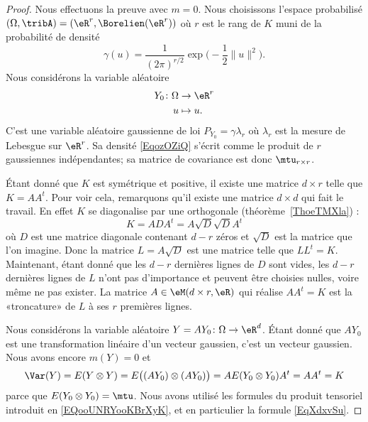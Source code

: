 \begin{proof}
	Nous effectuons la preuve avec \( m=0\). Nous choisissons l'espace probabilisé \( (\Omega,\tribA)=(\eR^r,\Borelien(\eR^r))\) où \( r\) est le rang de \( K\) muni de la probabilité de densité
	\begin{equation}    \label{EqozOZiQ}
		\gamma(u)=\frac{1}{ (2\pi)^{r/2} }\exp\big( -\frac{ 1 }{2}\| u \|^2 \big).
	\end{equation}
	Nous considérons la variable aléatoire
	\begin{equation}
		\begin{aligned}
			Y_0\colon \Omega & \to \eR^r  \\
			u                & \mapsto u.
		\end{aligned}
	\end{equation}
	C'est une variable aléatoire gaussienne de loi \( P_{Y_0}=\gamma\lambda_r\) où \( \lambda_r\) est la mesure de Lebesgue sur \( \eR^r\). Sa densité \eqref{EqozOZiQ} s'écrit comme le produit de \( r\) gaussiennes indépendantes; sa matrice de covariance est donc \( \mtu_{r\times r}\).

	Étant donné que \( K\) est symétrique et positive, il existe une matrice \( d\times r\) telle que \( K=AA^t\). Pour voir cela, remarquons qu'il existe une matrice \( d\times d\) qui fait le travail. En effet \( K\) se diagonalise par une orthogonale (théorème~\ref{ThoeTMXla}) :
	\begin{equation}
		K=ADA^t=A\sqrt{D}\sqrt{D}A^t
	\end{equation}
	où \( D\) est une matrice diagonale contenant \( d-r\) zéros et \( \sqrt{D}\) est la matrice que l'on imagine. Donc la matrice \( L=A\sqrt{D}\) est une matrice telle que \( LL^t=K\). Maintenant, étant donné que les \( d-r\) dernières lignes de \( D\) sont vides, les \( d-r\) dernières lignes de \( L\) n'ont pas d'importance et peuvent être choisies nulles, voire même ne pas exister. La matrice \( A\in\eM(d\times r,\eR)\) qui réalise \( AA^t=K\) est la «troncature» de \( L\) à ses \( r\) premières lignes.

	Nous considérons la variable aléatoire \( Y=AY_0\colon \Omega\to \eR^d\). Étant donné que \( AY_0\) est une transformation linéaire d'un vecteur gaussien, c'est un vecteur gaussien. Nous avons encore \( m(Y)=0\) et
	\begin{equation}
		\Var(Y)=E(Y\otimes Y)=E\big( (AY_0)\otimes (AY_0) \big)=AE(Y_0\otimes Y_0)A^t=AA^t=K
	\end{equation}
	parce que \( E(Y_0\otimes Y_0)=\mtu\). Nous avons utilisé les formules du produit tensoriel introduit en \eqref{EQooUNRYooKBrXyK}, et en particulier la formule \eqref{EqXdxvSu}.
\end{proof}

